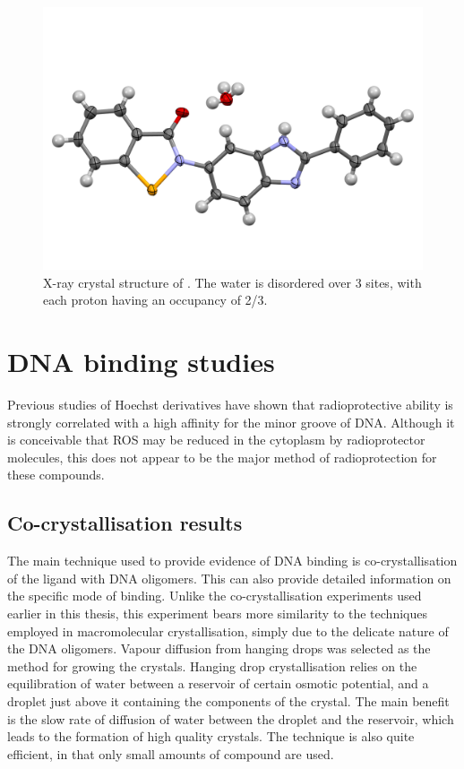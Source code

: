 \begin{refsection}
\begin{figure}[ht]
    \centering
    \includegraphics[width=0.8\linewidth]{Figures/ebs-rhs-xray.pdf}
    \caption[X-ray crystal structure of .]{X-ray crystal structure of . The water is disordered over 3 sites, with each proton having an occupancy of 2/3.}\label{fig:ebs-rhs-xray}
\end{figure}

\section{DNA binding studies}
Previous studies of Hoechst derivatives have shown that radioprotective ability is strongly correlated with a high affinity for the minor groove of DNA.\@
Although it is conceivable that ROS may be reduced in the cytoplasm by radioprotector molecules, this does not appear to be the major method of radioprotection for these compounds.

\subsection{Co-crystallisation results}
The main technique used to provide evidence of DNA binding is co-crystallisation of the ligand with DNA oligomers.
This can also provide detailed information on the specific mode of binding.
Unlike the co-crystallisation experiments used earlier in this thesis, this experiment bears more similarity to the techniques employed in macromolecular crystallisation, simply due to the delicate nature of the DNA oligomers.
Vapour diffusion from hanging drops was selected as the method for growing the crystals.
Hanging drop crystallisation relies on the equilibration of water between a reservoir of certain osmotic potential, and a droplet just above it containing the components of the crystal.
The main benefit is the slow rate of diffusion of water between the droplet and the reservoir, which leads to the formation of high quality crystals.
The technique is also quite efficient, in that only small amounts of compound are used.


\end{refsection}
